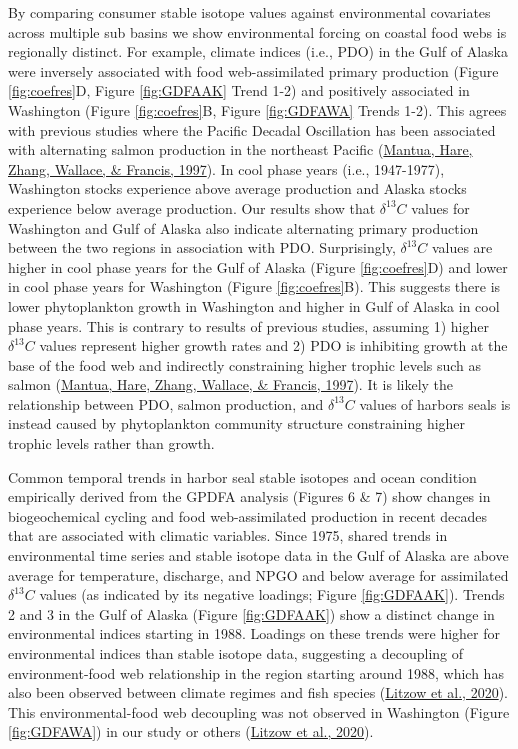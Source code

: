 \documentclass [11pt, proquest] {uwthesis}[2015/03/03]
\begin{document}
By comparing consumer stable isotope values against environmental covariates across multiple sub basins we show environmental forcing on coastal food webs is regionally distinct. For example, climate indices (i.e., PDO) in the Gulf of Alaska were inversely associated with food web-assimilated primary production (Figure \ref{fig:coefres}D, Figure \ref{fig:GDFAAK} Trend 1-2) and positively associated in Washington (Figure \ref{fig:coefres}B, Figure \ref{fig:GDFAWA} Trends 1-2). This agrees with previous studies where the Pacific Decadal Oscillation has been associated with alternating salmon production in the northeast Pacific (\protect\hyperlink{ref-Mantua1997}{Mantua, Hare, Zhang, Wallace, \& Francis, 1997}). In cool phase years (i.e., 1947-1977), Washington stocks experience above average production and Alaska stocks experience below average production. Our results show that \(\delta^{13}C\) values for Washington and Gulf of Alaska also indicate alternating primary production between the two regions in association with PDO. Surprisingly, \(\delta^{13}C\) values are higher in cool phase years for the Gulf of Alaska (Figure \ref{fig:coefres}D) and lower in cool phase years for Washington (Figure \ref{fig:coefres}B). This suggests there is lower phytoplankton growth in Washington and higher in Gulf of Alaska in cool phase years. This is contrary to results of previous studies, assuming 1) higher \(\delta^{13}C\) values represent higher growth rates and 2) PDO is inhibiting growth at the base of the food web and indirectly constraining higher trophic levels such as salmon (\protect\hyperlink{ref-Mantua1997}{Mantua, Hare, Zhang, Wallace, \& Francis, 1997}). It is likely the relationship between PDO, salmon production, and \(\delta^{13}C\) values of harbors seals is instead caused by phytoplankton community structure constraining higher trophic levels rather than growth.

Common temporal trends in harbor seal stable isotopes and ocean condition empirically derived from the GPDFA analysis (Figures 6 \& 7) show changes in biogeochemical cycling and food web-assimilated production in recent decades that are associated with climatic variables. Since 1975, shared trends in environmental time series and stable isotope data in the Gulf of Alaska are above average for temperature, discharge, and NPGO and below average for assimilated \(\delta^{13}C\) values (as indicated by its negative loadings; Figure \ref{fig:GDFAAK}). Trends 2 and 3 in the Gulf of Alaska (Figure \ref{fig:GDFAAK}) show a distinct change in environmental indices starting in 1988. Loadings on these trends were higher for environmental indices than stable isotope data, suggesting a decoupling of environment-food web relationship in the region starting around 1988, which has also been observed between climate regimes and fish species (\protect\hyperlink{ref-Litzow2020}{Litzow et al., 2020}). This environmental-food web decoupling was not observed in Washington (Figure \ref{fig:GDFAWA}) in our study or others (\protect\hyperlink{ref-Litzow2020}{Litzow et al., 2020}).
\end{document}
